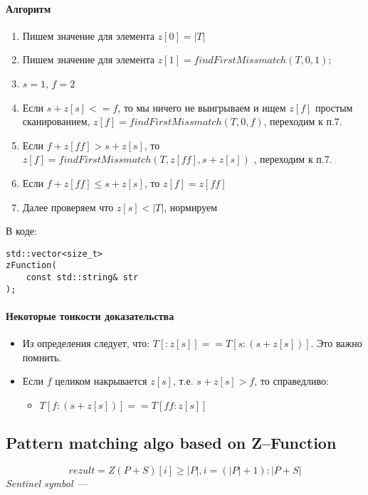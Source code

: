\documentclass{article}
\begin{document}
\paragraph{Алгоритм}
\begin{enumerate}
    \item Пишем значение для элемента $z[0] = |T|$
    \item Пишем значение для элемента $z[1] = findFirstMissmatch(T, 0, 1);$
    \item $s = 1$, $f = 2$
    \item Если $s + z[s] <= f$, то мы ничего не выигрываем и ищем $z[f]$ простым
сканированием, $z[f] = findFirstMissmatch(T, 0, f)$, переходим к п.7.
    \item Если $f + z[ff] > s + z[s]$, то $z[f] = findFirstMissmatch(T, z[ff], s + z[s])$
, переходим к п.7.
    \item Если $f + z[ff] \leq s + z[s]$, то $z[f] = z[ff]$
    \item Далее проверяем что $z[s] < |T|$, нормируем
\end{enumerate}

В коде:
\begin{lstlisting}
std::vector<size_t>
zFunction(
    const std::string& str
);
\end{lstlisting}

\paragraph{Некоторые тонкости доказательства}
\begin{itemize}
    \item Из определения следует, что:
        $T[:z[s]] == T[s:(s + z[s])]$. Это важно помнить.
    \item Если $f$ целиком накрывается $z[s]$, т.е. $s + z[s] > f$, то справедливо:
    \begin{itemize}
        \item $T[f:(s + z[s])] == T[ff:z[s]]$
    \end{itemize}
\end{itemize}

\subsection{Pattern matching algo based on Z--Function}
$$
    rezult = Z(P + S)[i] \geq |P|, i = (|P| + 1) : |P + S|
$$
\textit{Sentinel symbol}~---
\end{document}
